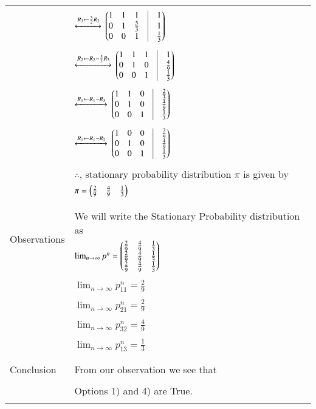 \documentclass[journal,12pt]{IEEEtran}
\begin{document}
\begin{longtable}{|l|l|}
		&\\
		& \qquad $\xleftrightarrow[]{R_3 \leftarrow \frac{3}{2}R_3}$
		$\myvec{1&1&1&\vrule&1\\0&1&\frac{5}{3}&\vrule&1\\0&0&1&\vrule&\frac{1}{3}}$\\
		&\\
		& \qquad $\xleftrightarrow[]{R_2 \leftarrow R_2 - \frac{5}{3}R_3}$
		$\myvec{1&1&1&\vrule&1\\0&1&0&\vrule&\frac{4}{9}\\0&0&1&\vrule&\frac{1}{3}}$\\
		&\\
		& \qquad $\xleftrightarrow[]{R_1 \leftarrow R_1 - R_3}$
		$\myvec{1&1&0&\vrule&\frac{2}{3}\\0&1&0&\vrule&\frac{4}{9}\\0&0&1&\vrule&\frac{1}{3}}$\\
		&\\
		& \qquad $\xleftrightarrow[]{R_1 \leftarrow R_1 - R_2}$
		$\myvec{1&0&0&\vrule&\frac{2}{9}\\0&1&0&\vrule&\frac{4}{9}\\0&0&1&\vrule&\frac{1}{3}}$\\
		&\\
		& $\therefore$, stationary probability distribution $\pi$ is given by \\
		& \qquad \qquad $\pi = \begin{pmatrix}\frac{2}{9} & \frac{4}{9} & \frac{1}{3}\end{pmatrix}$ \\
		& \\
		\hline
		\multirow{3}{*}{Observations} & \\
		& We will write the Stationary Probability distribution as \\
		& $\lim_{n \to \infty} p^{n} = \begin{pmatrix}\frac{2}{9}&\frac{4}{9}&\frac{1}{3}\\\frac{2}{9}&\frac{4}{9}&\frac{1}{3}\\\frac{2}{9}&\frac{4}{9}&\frac{1}{3}\end{pmatrix}$\\
		& \\
		& $\lim_{n \to \infty} p^{n}_{11} = \frac{2}{9}$ \\
		&\\
		& $\lim_{n \to \infty} p^{n}_{21} = \frac{2}{9}$ \\
		&\\
		& $\lim_{n \to \infty} p^{n}_{32} = \frac{4}{9}$ \\
		&\\
		& $\lim_{n \to \infty} p^{n}_{13} = \frac{1}{3}$ \\
		&\\
		\hline
		\multirow{3}{*}{Conclusion} & \\
		& From our observation we see that \\
		&\\
		& Options 1) and 4) are True.\\
		& \\
		\hline
	\end{longtable}
\end{document}
